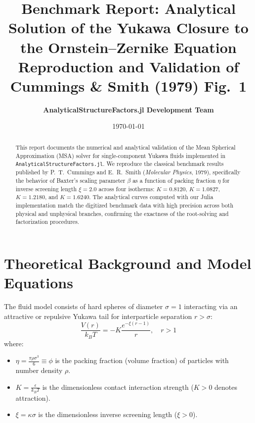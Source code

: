 \documentclass[11pt,a4paper]{article}
\title{\textbf{Benchmark Report: Analytical Solution of the Yukawa Closure to the Ornstein--Zernike Equation}\\[0.5em]
\large Reproduction and Validation of Cummings \& Smith (1979) Fig.~1}
\author{\textbf{AnalyticalStructureFactors.jl Development Team}}
\date{\today}
\begin{document}
\maketitle

\begin{abstract}
This report documents the numerical and analytical validation of the Mean Spherical Approximation (MSA) solver for single-component Yukawa fluids implemented in \texttt{AnalyticalStructureFactors.jl}. We reproduce the classical benchmark results published by P.~T.~Cummings and E.~R.~Smith (\textit{Molecular Physics}, 1979), specifically the behavior of Baxter's scaling parameter $\beta$ as a function of packing fraction $\eta$ for inverse screening length $\xi = 2.0$ across four isotherms: $K = 0.8120$, $K = 1.0827$, $K = 1.2180$, and $K = 1.6240$. The analytical curves computed with our Julia implementation match the digitized benchmark data with high precision across both physical and unphysical branches, confirming the exactness of the root-solving and factorization procedures.
\end{abstract}

\section{Theoretical Background and Model Equations}

The fluid model consists of hard spheres of diameter $\sigma = 1$ interacting via an attractive or repulsive Yukawa tail for interparticle separation $r > \sigma$:
\begin{equation}
    \frac{V(r)}{k_B T} = -K \frac{e^{-\xi (r - 1)}}{r}, \quad r > 1
\end{equation}
where:
\begin{itemize}
    \item $\eta = \frac{\pi \rho \sigma^3}{6} \equiv \phi$ is the packing fraction (volume fraction) of particles with number density $\rho$.
    \item $K = \frac{\epsilon}{k_B T}$ is the dimensionless contact interaction strength ($K > 0$ denotes attraction).
    \item $\xi = \kappa \sigma$ is the dimensionless inverse screening length ($\xi > 0$).
\end{itemize}
\end{document}
